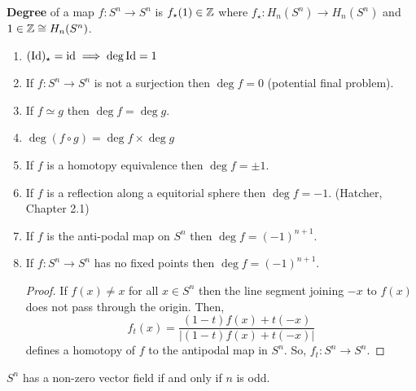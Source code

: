 \documentclass[12pt]{amsart}
\begin{document}
\begin{definition}
    \textbf{Degree} of a map $f: S^n \to S^n$ is $f_{\star}(1) \in \mathbb Z$ where $f_{\star}: H_n(S^n) \to H_n(S^n)$ and $1 \in \mathbb Z \cong H_n(S^n)$. 

    \begin{example}
        \bbni
        \begin{enumerate}
            \item $(\operatorname{Id})_{\star} = \operatorname{id} \implies \deg \operatorname{Id} = 1$ 
            \item If $f: S^n \to S^n$ is not a surjection then $\deg f = 0$ (potential final problem). 
            \item If $f \simeq g$ then $\deg f = \deg g$. 
            \item $\deg(f \circ g) = \deg f \times \deg g$
            \item If $f$ is a homotopy equivalence then $\deg f = \pm 1$. 
            \item If $f$ is a reflection along a equitorial sphere then $\deg f = - 1$. (Hatcher, Chapter 2.1)
            \item If $f$ is the anti-podal map on $S^n$ then $\deg f = (-1)^{n+1}$.
            \item If $f: S^n \to S^n$ has no fixed points then $\deg f = (-1)^{n+1}$. 
            \begin{proof}
                If $f(x) \neq x$ for all $x \in S^n$ then the line segment joining $-x$ to $f(x)$ does not pass through the origin. Then, 
                \[f_t(x) = \frac{(1-t)f(x) + t(-x)}{|(1-t)f(x) + t(-x)|}\] defines a homotopy of $f$ to the antipodal map in $S^n$. So, $f_t: S^n \to S^n$. 
            \end{proof}
        \end{enumerate}
    \end{example}
\end{definition}

\begin{theorem}
    $S^n$ has a non-zero vector field if and only if $n$ is odd. 
\end{theorem}
\end{document}
